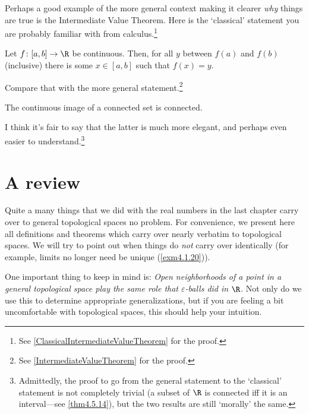 Perhaps a good example of the more general context making it clearer \emph{why} things are true is the Intermediate Value Theorem.  Here is the `classical' statement you are probably familiar with from calculus.\footnote{See \cref{ClassicalIntermediateValueTheorem} for the proof.}
\begin{textequation}
Let $f\colon [a,b]\rightarrow \R$ be continuous.  Then, for all $y$ between $f(a)$ and $f(b)$ (inclusive) there is some $x\in [a,b]$ such that $f(x)=y$.
\end{textequation}
Compare that with the more general statement.\footnote{See \cref{IntermediateValueTheorem} for the proof.}
\begin{textequation}
The continuous image of a connected set is connected.
\end{textequation}
I think it's fair to say that the latter is much more elegant, and perhaps even easier to understand.\footnote{Admittedly, the proof to go from the general statement to the `classical' statement is not completely trivial (a subset of $\R$ is connected iff it is an interval---see \cref{thm4.5.14}), but the two results are still `morally' the same.}

\section{A review}

Quite a many things that we did with the real numbers in the last chapter carry over to general topological spaces no problem.  For convenience, we present here all definitions and theorems which carry over nearly verbatim to topological spaces.  We will try to point out when things do \emph{not} carry over identically (for example, limits no longer need be unique (\cref{exm4.1.20})).

One important thing to keep in mind is:  \emph{Open neighborhoods of a point in a general topological space play the same role that $\varepsilon$-balls did in $\R$}.  Not only do we use this to determine appropriate generalizations, but if you are feeling a bit uncomfortable with topological spaces, this should help your intuition.

